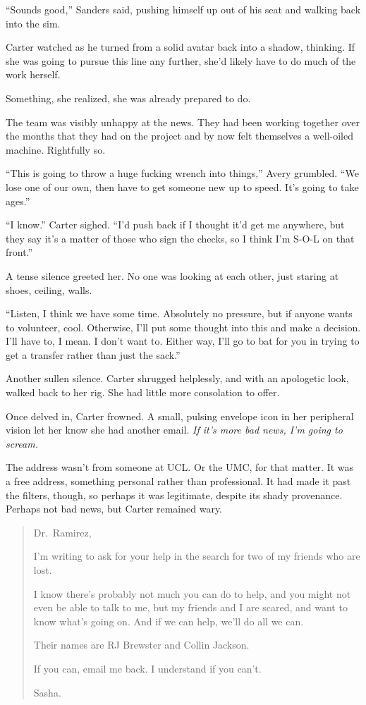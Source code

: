 ``Sounds good,'' Sanders said, pushing himself up out of his seat and walking back into the sim.

Carter watched as he turned from a solid avatar back into a shadow, thinking. If she was going to pursue this line any further, she'd likely have to do much of the work herself.

Something, she realized, she was already prepared to do.

The team was visibly unhappy at the news. They had been working together over the months that they had on the project and by now felt themselves a well-oiled machine. Rightfully so.

``This is going to throw a huge fucking wrench into things,'' Avery grumbled. ``We lose one of our own, then have to get someone new up to speed. It's going to take ages.''

``I know.'' Carter sighed. ``I'd push back if I thought it'd get me anywhere, but they say it's a matter of those who sign the checks, so I think I'm S-O-L on that front.''

A tense silence greeted her. No one was looking at each other, just staring at shoes, ceiling, walls.

``Listen, I think we have some time. Absolutely no pressure, but if anyone wants to volunteer, cool. Otherwise, I'll put some thought into this and make a decision. I'll have to, I mean. I don't want to. Either way, I'll go to bat for you in trying to get a transfer rather than just the sack.''

Another sullen silence. Carter shrugged helplessly, and with an apologetic look, walked back to her rig. She had little more consolation to offer.

Once delved in, Carter frowned. A small, pulsing envelope icon in her peripheral vision let her know she had another email. \emph{If it's more bad news, I'm going to scream.}

The address wasn't from someone at UCL. Or the UMC, for that matter. It was a free address, something personal rather than professional. It had made it past the filters, though, so perhaps it was legitimate, despite its shady provenance. Perhaps not bad news, but Carter remained wary.

\begin{quote}
Dr.~Ramirez,

I'm writing to ask for your help in the search for two of my friends who are lost.

I know there's probably not much you can do to help, and you might not even be able to talk to me, but my friends and I are scared, and want to know what's going on. And if we can help, we'll do all we can.

Their names are RJ Brewster and Collin Jackson.

If you can, email me back. I understand if you can't.

Sasha.
\end{quote}

